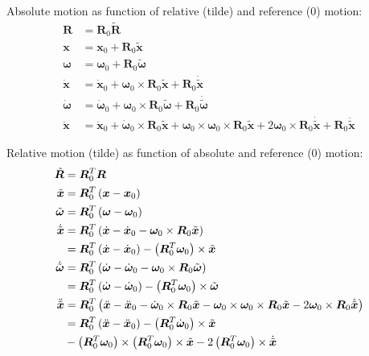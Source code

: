 \documentclass[10pt,dvips,fleqn,subeqn]{report}
\newcommand{\T}[1]{\bm{#1}}
\newcommand{\TT}[1]{\bm{#1}}
\begin{document}
Absolute motion as function of relative (tilde) and reference (0) motion:
\begin{subequations}
\begin{align}
	\TT{R} &= \TT{R}_0 \tilde{\TT{R}} \\
	\T{x} &= \T{x}_0 + \TT{R}_0 \tilde{\T{x}} \\
	\T{\omega} &= \T{\omega}_0 + \TT{R}_0 \tilde{\T{\omega}} \\
	\dot{\T{x}} &= \dot{\T{x}}_0
		+ \T{\omega}_0 \times \TT{R}_0 \tilde{\T{x}}
		+ \TT{R}_0 \dot{\tilde{\T{x}}}
		\label{eq:relframe:xp} \\
	\dot{\T{\omega}} &= \dot{\T{\omega}}_0
		+ \T{\omega}_0 \times \TT{R}_0 \tilde{\T{\omega}}
		+ \TT{R}_0 \dot{\tilde{\T{\omega}}} \\
	\ddot{\T{x}} &= \ddot{\T{x}}_0
		+ \dot{\T{\omega}}_0 \times \TT{R}_0 \tilde{\T{x}}
		+ \T{\omega}_0 \times \T{\omega}_0 \times \TT{R}_0 \tilde{\T{x}}
		+ 2 \T{\omega}_0 \times \TT{R}_0 \dot{\tilde{\T{x}}}
		+ \TT{R}_0 \ddot{\tilde{\T{x}}}
\end{align}
\end{subequations}

Relative motion (tilde) as function of absolute and reference (0) motion:
\begin{subequations}
\begin{align}
	\tilde{\TT{R}} &= \TT{R}_0^T \TT{R} \\
	\tilde{\T{x}} &= \TT{R}_0^T\plbr{\T{x} - \T{x}_0} \\
	\tilde{\T{\omega}} &= \TT{R}_0^T\plbr{\T{\omega} - \T{\omega}_0} \\
	\dot{\tilde{\T{x}}} &= \TT{R}_0^T\plbr{
		\dot{\T{x}} - \dot{\T{x}}_0
		- \T{\omega}_0 \times \TT{R}_0 \tilde{\T{x}}
	} \nonumber \\
	&= \TT{R}_0^T\plbr{
		\dot{\T{x}} - \dot{\T{x}}_0
	} - \plbr{\TT{R}_0^T \T{\omega}_0} \times \tilde{\T{x}} \\
	\dot{\tilde{\T{\omega}}} &= \TT{R}_0^T\plbr{
		\dot{\T{\omega}}
		- \dot{\T{\omega}}_0
		- \T{\omega}_0 \times \TT{R}_0 \tilde{\T{\omega}}
	} \nonumber \\
	&= \TT{R}_0^T\plbr{
		\dot{\T{\omega}}
		- \dot{\T{\omega}}_0
	} - \plbr{\TT{R}_0^T \T{\omega}_0} \times \tilde{\T{\omega}} \\
	\ddot{\tilde{\T{x}}} &= \TT{R}_0^T\plbr{
		\ddot{\T{x}}
		- \ddot{\T{x}}_0
		- \dot{\T{\omega}}_0 \times \TT{R}_0 \tilde{\T{x}}
		- \T{\omega}_0 \times \T{\omega}_0 \times \TT{R}_0 \tilde{\T{x}}
		- 2 \T{\omega}_0 \times \TT{R}_0 \dot{\tilde{\T{x}}}
	} \nonumber \\
 	&= \TT{R}_0^T\plbr{
		\ddot{\T{x}}
		- \ddot{\T{x}}_0
	} - \plbr{\TT{R}_0^T \dot{\T{\omega}}_0} \times \tilde{\T{x}} \nonumber \\
	& \mbox{} - \plbr{\TT{R}_0^T \T{\omega}_0} \times \plbr{\TT{R}_0^T \T{\omega}_0} \times \tilde{\T{x}}
		- 2 \plbr{\TT{R}_0^T \T{\omega}_0} \times \dot{\tilde{\T{x}}}
\end{align}
\end{subequations}
\end{document}
